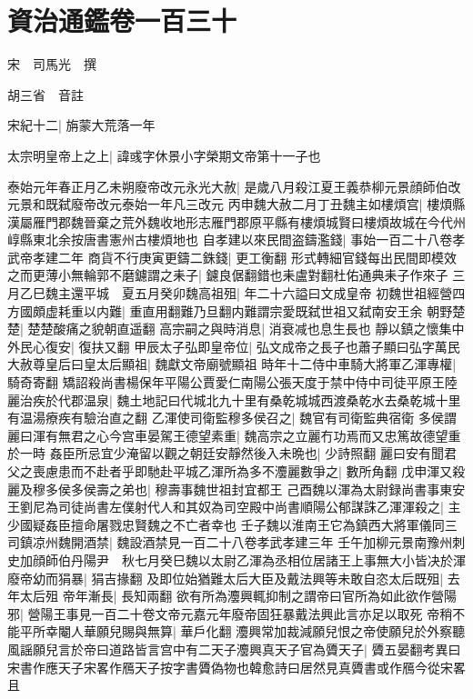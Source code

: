 \section{資治通鑑卷一百三十}
宋　司馬光　撰

胡三省　音註

宋紀十二|{
	旃蒙大荒落一年}


太宗明皇帝上之上|{
	諱彧字休景小字榮期文帝第十一子也}


泰始元年春正月乙未朔廢帝改元永光大赦|{
	是歲八月殺江夏王義恭柳元景顔師伯改元景和既弑廢帝改元泰始一年凡三改元}
丙申魏大赦二月丁丑魏主如樓煩宫|{
	樓煩縣漢屬雁門郡魏晉棄之荒外魏收地形志雁門郡原平縣有樓煩城賢曰樓煩故城在今代州崞縣東北余按唐書憲州古樓煩地也}
自孝建以來民間盗鑄濫錢|{
	事始一百二十八卷孝武帝孝建二年}
商貨不行庚寅更鑄二銖錢|{
	更工衡翻}
形式轉細官錢每出民間即模效之而更薄小無輪郭不磨鑢謂之耒子|{
	鑢良倨翻錯也耒盧對翻杜佑通典耒子作來子}
三月乙巳魏主還平城　夏五月癸卯魏高祖殂|{
	年二十六謚曰文成皇帝}
初魏世祖經營四方國頗虚耗重以内難|{
	重直用翻難乃旦翻内難謂宗愛既弑世祖又弑南安王余}
朝野楚楚|{
	楚楚酸痛之貌朝直遥翻}
高宗嗣之與時消息|{
	消衰减也息生長也}
靜以鎮之懷集中外民心復安|{
	復扶又翻}
甲辰太子弘即皇帝位|{
	弘文成帝之長子也蕭子顯曰弘字萬民}
大赦尊皇后曰皇太后顯祖|{
	魏獻文帝廟號顯祖}
時年十二侍中車騎大將軍乙渾專權|{
	騎奇寄翻}
矯詔殺尚書楊保年平陽公賈愛仁南陽公張天度于禁中侍中司徒平原王陸麗治疾於代郡温泉|{
	魏土地記曰代城北九十里有桑乾城城西渡桑乾水去桑乾城十里有温湯療疾有驗治直之翻}
乙渾使司衛監穆多侯召之|{
	魏官有司衛監典宿衛}
多侯謂麗曰渾有無君之心今宫車晏駕王德望素重|{
	魏高宗之立麗冇功焉而又忠篤故德望重於一時}
姦臣所忌宜少淹留以觀之朝廷安靜然後入未晩也|{
	少詩照翻}
麗曰安有聞君父之喪慮患而不赴者乎即馳赴平城乙渾所為多不灋麗數爭之|{
	數所角翻}
戊申渾又殺麗及穆多侯多侯壽之弟也|{
	穆壽事魏世祖封宜都王}
己酉魏以渾為太尉録尚書事東安王劉尼為司徒尚書左僕射代人和其奴為司空殿中尚書順陽公郁謀誅乙渾渾殺之|{
	主少國疑姦臣擅命屠戮忠賢魏之不亡者幸也}
壬子魏以淮南王它為鎮西大將軍儀同三司鎮凉州魏開酒禁|{
	魏設酒禁見一百二十八卷孝武孝建三年}
壬午加柳元景南豫州刺史加顔師伯丹陽尹　秋七月癸巳魏以太尉乙渾為丞相位居諸王上事無大小皆决於渾　廢帝幼而狷暴|{
	狷吉掾翻}
及即位始猶難太后大臣及戴法興等未敢自恣太后既殂|{
	去年太后殂}
帝年漸長|{
	長知兩翻}
欲有所為灋興輒抑制之謂帝曰官所為如此欲作營陽邪|{
	營陽王事見一百二十卷文帝元嘉元年廢帝固狂暴戴法興此言亦足以取死}
帝稍不能平所幸閹人華願兒賜與無算|{
	華戶化翻}
灋興常加裁減願兒恨之帝使願兒於外察聽風謡願兒言於帝曰道路皆言宫中有二天子灋興真天子官為贗天子|{
	贗五晏翻考異曰宋書作應天子宋畧作鴈天子按字書贗偽物也韓愈詩曰居然見真贗書或作鴈今從宋畧}
且

